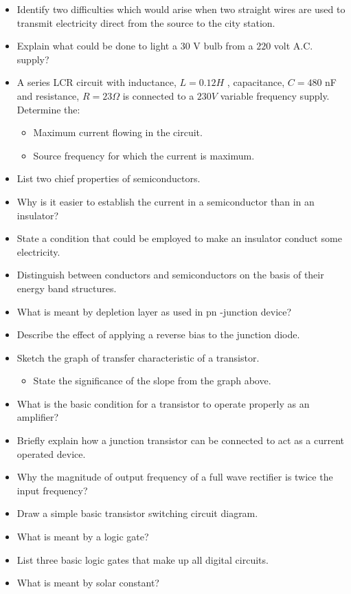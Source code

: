 \documentclass{article}
\begin{document}
\begin{itemize}
\item Identify two difficulties which would arise when two straight wires are used to transmit electricity direct from the source to the city station. 
\item Explain what could be done to light a $ 30$ V bulb from a $ 220$ volt A.C. supply?
\item A series LCR circuit with inductance, $ L=0.12H$ , capacitance, $ C=480$ nF and resistance, $ R=23\Omega $ is connected to a $ 230V$ variable frequency supply. Determine the:
 \begin{itemize}
\item Maximum current flowing in the circuit. 
\item Source frequency for which the current is maximum. 
\end{itemize}
\item List two chief properties of semiconductors. 
\item Why is it easier to establish the current in a semiconductor than in an insulator?
\item State a condition that could be employed to make an insulator conduct some electricity. 
\item Distinguish between conductors and semiconductors on the basis of their energy band structures. 
\item What is meant by depletion layer as used in pn -junction device? 
\item Describe the effect of applying a reverse bias to the junction diode. 
\item Sketch the graph of transfer characteristic of a transistor. 
 \begin{itemize}
\item State the significance of the slope from the graph above.
\end{itemize}
\item What is the basic condition for a transistor to operate properly as an amplifier? 
\item Briefly explain how a junction transistor can be connected to act as a current operated device. 
\item Why the magnitude of output frequency of a full wave rectifier is twice the input frequency? 
\item Draw a simple basic transistor switching circuit diagram. 
\item What is meant by a logic gate? 
\item List three basic logic gates that make up all digital circuits. 
\item What is meant by solar constant? 

\end{itemize}
\end{document}
